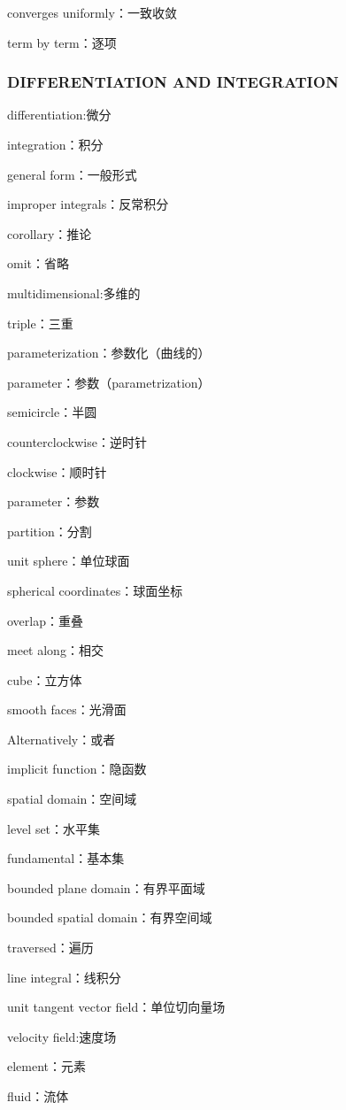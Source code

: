 \documentclass[hazy,blue,11pt]{elegantnote}
\begin{document}
    converges uniformly：一致收敛

    term by term：逐项

\subsubsection{DIFFERENTIATION AND INTEGRATION}

    differentiation:微分

    integration：积分

    general form：一般形式

    improper integrals：反常积分

    corollary：推论

    omit：省略

    multidimensional:多维的

    triple：三重

    parameterization：参数化（曲线的）

    parameter：参数（parametrization）

    semicircle：半圆

    counterclockwise：逆时针

    clockwise：顺时针

    parameter：参数

    partition：分割

    unit sphere：单位球面

    spherical coordinates：球面坐标

    overlap：重叠

    meet along：相交

    cube：立方体

    smooth faces：光滑面

    Alternatively：或者

    implicit function：隐函数

    spatial domain：空间域

    level set：水平集

    fundamental：基本集

    bounded plane domain：有界平面域

    bounded spatial domain：有界空间域

    traversed：遍历

    line integral：线积分

    unit tangent vector field：单位切向量场

    velocity field:速度场

    element：元素

    fluid：流体
\end{document}
